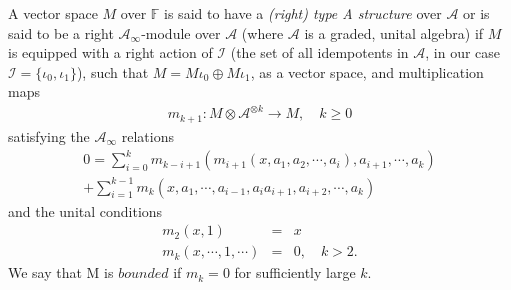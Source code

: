 \documentclass[11pt,reqno]{amsart}
\theoremstyle{definition}
\newtheorem *{remark}{Remark}
\begin{document}
A vector space $M$ over $\mathbb{F}$ is said to have a \emph{(right) type A structure} over $\mathcal{A}$ or is said to be a right $\mathcal{A}_{\infty}$-module over $\mathcal{A}$ (where $\mathcal{A}$ is a graded, unital algebra) if $M$ is equipped with a right action of $\mathcal{I}$ (the set of all idempotents in $\mathcal{A}$, in our case $\mathcal{I} = \{\iota_0,\iota_1\}$), such that $M = M\iota_0 \oplus M\iota_1 $, as a vector space, and multiplication maps
\begin{align*}
 m_{k+1} : M\otimes \mathcal{A}^{\otimes k} \rightarrow M  , \quad k \geq 0  
\end{align*}
satisfying the $\mathcal{A}_{\infty}$ relations
\begin{align*}
    0 = \sum_{i=0}^{k} m_{k-i+1}(m_{i+1}(x, a_1, a_2, \cdots, a_i), a_{i+1}, \cdots, a_k) \\ +  \sum_{i=1}^{k-1} m_k(x, a_1, \cdots, a_{i-1}, a_ia_{i+1}, a _{i+2}, \cdots, a_k)
\end{align*}
and the unital conditions
\begin{eqnarray*}
m_2(x,1) &=& x \\
m_k(x, \cdots, 1, \cdots ) &=& 0, \quad k >2.
\end{eqnarray*}
We say that M is $bounded$ if $m_k = 0$ for sufficiently large $k$.
\end{document}
